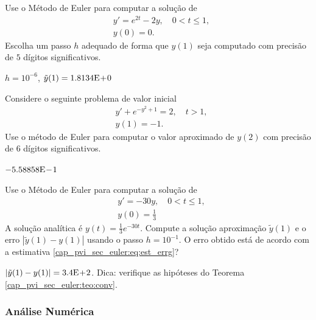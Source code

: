 \begin{exer}
  Use o Método de Euler para computar a solução de
  \begin{subequations}
    \begin{align}
      &y' = e^{2t} - 2y,\quad 0 < t\leq 1,\\
      &y(0) = 0.
    \end{align}
  \end{subequations}
  Escolha um passo $h$ adequado de forma que $y(1)$ seja computado com precisão de $5$ dígitos significativos.
\end{exer}
\begin{resp}
  $h=10^{-6}$, $\tilde{y}(1) = 1.8134\mathrm{E}\!+\!0$
\end{resp}

\begin{exer}
  Considere o seguinte problema de valor inicial
  \begin{subequations}
    \begin{align}
      &y' + e^{-y^2+1} = 2,\quad t>1,\\
      &y(1) = -1.
    \end{align}
\end{subequations}
Use o método de Euler para computar o valor aproximado de $y(2)$ com precisão de $6$ dígitos significativos.
\end{exer}
\begin{resp}
  $-5.58858\mathrm{E}\!-\!1$
\end{resp}

\begin{exer}
  Use o Método de Euler para computar a solução de
  \begin{subequations}
    \begin{align}
      &y' = -30y,\quad 0 < t\leq 1,\\
      &y(0) = \frac{1}{3}
    \end{align}
  \end{subequations}
  A solução analítica é $y(t) = \frac{1}{3}e^{-30t}$. Compute a solução aproximação $\tilde{y}(1)$ e o erro $|\tilde{y}(1) - y(1)|$ usando o passo $h=10^{-1}$. O erro obtido está de acordo com a estimativa \eqref{cap_pvi_sec_euler:eq:est_errg}?
\end{exer}
\begin{resp}
  $|\tilde{y}(1) - y(1)| = 3.4\mathrm{E}\!+\!2$. Dica: verifique as hipóteses do Teorema \ref{cap_pvi_sec_euler:teo:conv}.
\end{resp}

\subsubsection{Análise Numérica}


